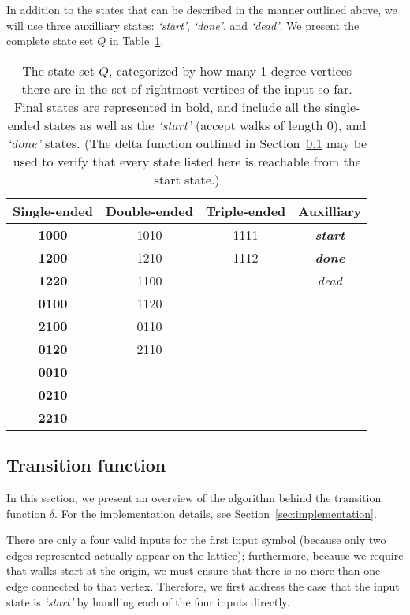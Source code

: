 In addition to the states that can be described in the manner outlined above, we will use three auxilliary states: \emph{`start'}, \emph{`done'}, and \emph{`dead'}. We present the complete state set $Q$ in Table~\ref{tab:states}.

\begin{table}
\begin{center}
\begin{tabular}{cccc}
\hline
Single-ended & Double-ended & Triple-ended & Auxilliary \\
\hline
\textbf{1000} & 1010 & 1111 & \emph{\textbf{start}} \\
\textbf{1200} & 1210 & 1112 & \emph{\textbf{done}} \\
\textbf{1220} & 1100 &  & \emph{dead} \\
\textbf{0100} & 1120 &  &  \\
\textbf{2100} & 0110 &  &  \\
\textbf{0120} & 2110 &  &  \\
\textbf{0010} &  &  &  \\
\textbf{0210} &  &  &  \\
\textbf{2210} &  &  &  \\
\hline
\end{tabular}
\end{center}
\caption{The state set $Q$, categorized by how many 1-degree vertices there are in the set of rightmost vertices of the input so far. Final states are represented in bold, and include all the single-ended states as well as the \emph{`start'} (accept walks of length 0), and \emph{`done'} states. (The delta function outlined in Section~\ref{sec:overview-delta} may be used to verify that every state listed here is reachable from the start state.)}
\label{tab:states}
\end{table}

\subsection{Transition function}
\label{sec:overview-delta}

In this section, we present an overview of the algorithm behind the transition function $\delta$. For the implementation details, see Section~\ref{sec:implementation}.

There are only a four valid inputs for the first input symbol (because only two edges represented actually appear on the lattice); furthermore, because we require that walks start at the origin, we must ensure that there is no more than one edge connected to that vertex. Therefore, we first address the case that the input state is \emph{`start'} by handling each of the four inputs directly.

